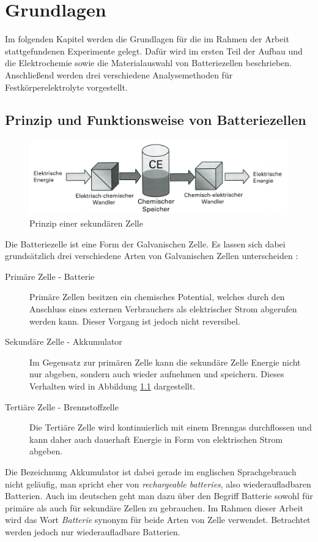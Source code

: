 \documentclass[a4paper, 11pt, headsepline,footsepline,twoside,abstract]{scrbook}
\begin{document}
\chapter{Grundlagen}
Im folgenden Kapitel werden die Grundlagen für die im Rahmen der Arbeit stattgefundenen Experimente gelegt. Dafür wird im ersten Teil der Aufbau und die Elektrochemie sowie die Materialauswahl von Batteriezellen beschrieben. Anschließend werden drei verschiedene Analysemethoden für Festkörperelektrolyte vorgestellt.
\section{Prinzip und Funktionsweise von Batteriezellen}
\begin{figure}
	\centering
	\includegraphics[width=1.0\columnwidth]{images/Prinzipieller_Aufbau.png}
	\caption{Prinzip einer sekundären Zelle \cite{jossen_2006}}
	\label{Prinzip_Zelle}
\end{figure}
Die Batteriezelle ist eine Form der Galvanischen Zelle. Es lassen sich dabei grundsätzlich drei verschiedene Arten von Galvanischen Zellen unterscheiden \cite{jossen_2006}:
\begin{description}
\item[Primäre Zelle - Batterie] Primäre Zellen besitzen ein chemisches Potential, welches durch den Anschluss eines externen Verbrauchers als elektrischer Strom abgerufen werden kann. Dieser Vorgang ist jedoch nicht reversibel.
\item[Sekundäre Zelle - Akkumulator] Im Gegensatz zur primären Zelle kann die sekundäre Zelle Energie nicht nur abgeben, sondern auch wieder aufnehmen und speichern. Dieses Verhalten wird in Abbildung \ref{Prinzip_Zelle} dargestellt.
\item[Tertiäre Zelle - Brennstoffzelle] Die Tertiäre Zelle wird kontinuierlich mit einem Brenngas durchflossen und kann daher auch dauerhaft Energie in Form von elektrischen Strom abgeben.  
\end{description}
Die Bezeichnung Akkumulator ist dabei gerade im englischen Sprachgebrauch nicht geläufig, man spricht eher von \textit{rechargeable batteries}, also wiederaufladbaren Batterien. Auch im deutschen geht man dazu über den Begriff Batterie sowohl für primäre als auch für sekundäre Zellen zu gebrauchen. Im Rahmen dieser Arbeit wird das Wort \textit{Batterie} synonym für beide Arten von Zelle verwendet. Betrachtet werden jedoch nur wiederaufladbare Batterien.
\end{document}
